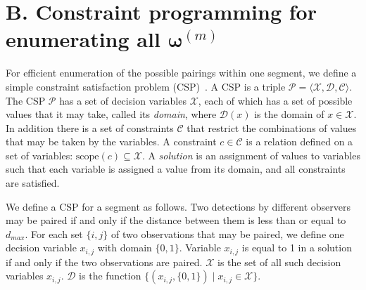 \documentclass[useAMS, usenatbib, referee]{biom}\usepackage[]{graphicx}\usepackage[]{color}
\begin{document}



\section{B. Constraint programming for enumerating all $\bm{\omega}^{(m)}$}
\label{appx:constrprog}

For efficient enumeration of the possible pairings within one segment, we define a simple constraint satisfaction problem (CSP)~\cite[Chapter 6]{russell-norvig-aima3}. A CSP is a triple \(\mathcal{P}=\langle \mathcal{X}, \mathcal{D}, \mathcal{C} \rangle\).  The CSP \(\mathcal{P}\) has a set of decision variables \(\mathcal{X}\), each of which has a set of possible values that it may take, called its \textit{domain}, where \(\mathcal{D}(x)\) is the domain of \(x \in \mathcal{X}\). In addition there is a set of constraints \(\mathcal{C}\) that restrict the combinations of values that may be taken by the variables. A constraint \(c\in \mathcal{C}\) is a relation defined on a set of variables: \(\mathrm{scope}(c)\subseteq \mathcal{X}\). A \textit{solution} is an assignment of values to variables such that each variable is assigned a value from its domain, and all constraints are satisfied.

We define a CSP for a segment as follows. Two detections by different observers may be paired if and only if the distance between them is less than or equal to \(d_{max}\). For each set \(\{i,j\}\) of two observations that may be paired, we define one decision variable \(x_{i,j}\) with domain \(\{0,1\}\). Variable \(x_{i,j}\) is equal to 1 in a solution if and only if the two observations are paired. \(\mathcal{X}\) is the set of all such decision variables \(x_{i,j}\). \(\mathcal{D}\) is the function \(\{ (x_{i,j}, \{0,1\})  \mid  x_{i,j} \in \mathcal{X} \}\).
\end{document}
